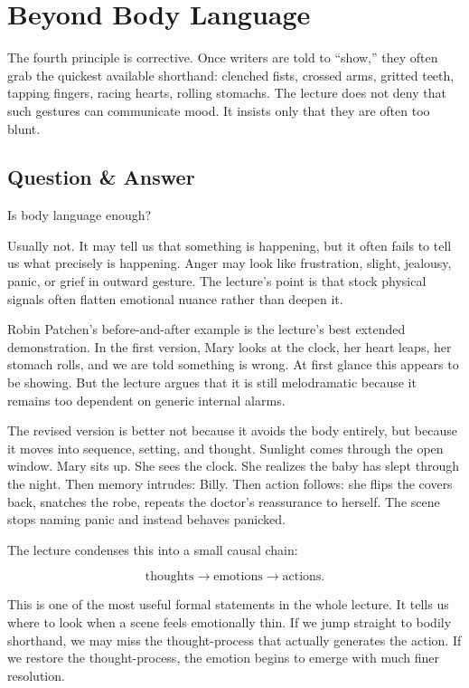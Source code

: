 \section{Beyond Body Language}

The fourth principle is corrective. Once writers are told to ``show,'' they often grab the quickest available shorthand: clenched fists, crossed arms, gritted teeth, tapping fingers, racing hearts, rolling stomachs. The lecture does not deny that such gestures can communicate mood. It insists only that they are often too blunt.

\subsection{Question \& Answer}

Is body language enough?

Usually not. It may tell us that something is happening, but it often fails to tell us what precisely is happening. Anger may look like frustration, slight, jealousy, panic, or grief in outward gesture. The lecture's point is that stock physical signals often flatten emotional nuance rather than deepen it.

Robin Patchen's before-and-after example is the lecture's best extended demonstration. In the first version, Mary looks at the clock, her heart leaps, her stomach rolls, and we are told something is wrong. At first glance this appears to be showing. But the lecture argues that it is still melodramatic because it remains too dependent on generic internal alarms.

The revised version is better not because it avoids the body entirely, but because it moves into sequence, setting, and thought. Sunlight comes through the open window. Mary sits up. She sees the clock. She realizes the baby has slept through the night. Then memory intrudes: Billy. Then action follows: she flips the covers back, snatches the robe, repeats the doctor's reassurance to herself. The scene stops naming panic and instead behaves panicked.

The lecture condenses this into a small causal chain:

\begin{equation}
\text{thoughts} \to \text{emotions} \to \text{actions}.
\end{equation}

This is one of the most useful formal statements in the whole lecture. It tells us where to look when a scene feels emotionally thin. If we jump straight to bodily shorthand, we may miss the thought-process that actually generates the action. If we restore the thought-process, the emotion begins to emerge with much finer resolution.

